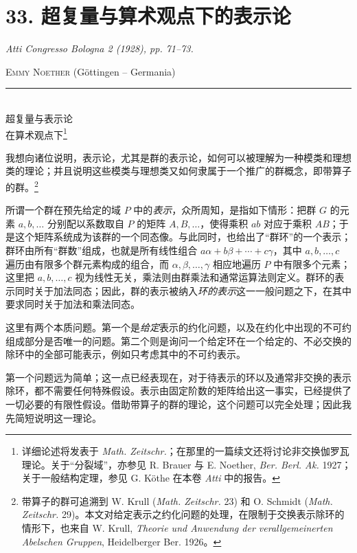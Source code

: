 \section*{33. 超复量与算术观点下的表示论}
\emph{Atti Congresso Bologna 2 (1928), pp. 71--73.}

\begingroup
\renewcommand{\thefootnote}{(\arabic{footnote})}

\begin{center}
\textsc{Emmy Noether} (Göttingen -- Germania)\\[-0.1em]
\rule{3em}{0.4pt}\\[0.8em]
\textsc{超复量与表示论}\\
\textsc{在算术观点下}\footnote{详细论述将发表于 \emph{Math. Zeitschr.}；在那里的一篇续文还将讨论非交换伽罗瓦理论。关于“分裂域”，亦参见 R. Brauer 与 E. Noether, \emph{Ber. Berl. Ak.} 1927；关于一般结构定理，参见 G. Köthe 在本卷 \emph{Atti} 中的报告。}
\end{center}

我想向诸位说明，表示论，尤其是群的表示论，如何可以被理解为一种模类和理想类的理论；并且说明这些模类与理想类又如何隶属于一个推广的群概念，即带算子的群。\footnote{带算子的群可追溯到 W. Krull (\emph{Math. Zeitschr.} 23) 和 O. Schmidt (\emph{Math. Zeitschr.} 29)。本文对给定表示之约化问题的处理，在限制于交换表示除环的情形下，也来自 W. Krull, \emph{Theorie und Anwendung der verallgemeinerten Abelschen Gruppen}, Heidelberger Ber. 1926。}

所谓一个群在预先给定的域 $P$ 中的\emph{表示}，众所周知，是指如下情形：把群 $G$ 的元素 $a,b,\ldots$ 分别配以系数取自 $P$ 的矩阵 $A,B,\ldots$，使得乘积 $ab$ 对应于乘积 $AB$；于是这个矩阵系统成为该群的一个同态像。与此同时，也给出了“群环”的一个表示；群环由所有“群数”组成，也就是所有线性组合 $a\alpha+b\beta+\cdots+c\gamma$，其中 $a,b,\ldots,c$ 遍历由有限多个群元素构成的组合，而 $\alpha,\beta,\ldots,\gamma$ 相应地遍历 $P$ 中有限多个元素；这里把 $a,b,\ldots,c$ 视为线性无关，乘法则由群乘法和通常运算法则定义。群环的表示同时关于加法同态；因此，群的表示被纳入\emph{环的表示}这一一般问题之下，在其中要求同时关于加法和乘法同态。

这里有两个本质问题。第一个是\emph{给定}表示的约化问题，以及在约化中出现的不可约组成部分是否唯一的问题。第二个则是询问一个给定环在一个给定的、不必交换的除环中的全部可能表示，例如只考虑其中的不可约表示。

第一个问题远为简单；这一点已经表现在，对于待表示的环以及通常非交换的表示除环，都不需要任何特殊假设。表示由固定阶数的矩阵给出这一事实，已经提供了一切必要的有限性假设。借助带算子的群的理论，这个问题可以完全处理；因此我先简短说明这一理论。

